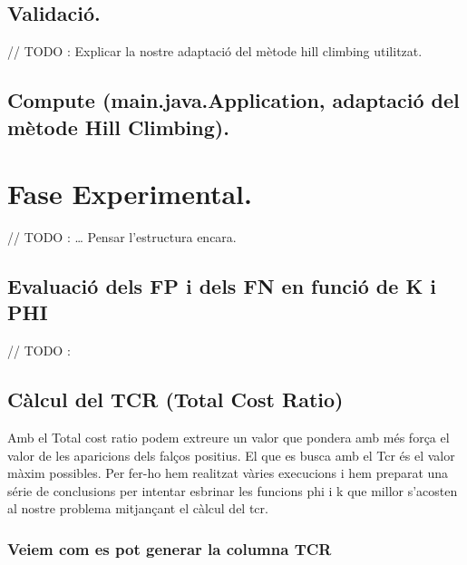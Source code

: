 \documentclass[]{article}
\begin{document}
\hypertarget{validacio.}{%
\subsection{Validació.}\label{validacio.}}

// TODO : Explicar la nostre adaptació del mètode hill climbing
utilitzat.

\hypertarget{compute-application-adaptacio-del-metode-hill-climbing.}{%
\subsection{Compute (main.java.Application, adaptació del mètode Hill
Climbing).}\label{compute-application-adaptacio-del-metode-hill-climbing.}}

\hypertarget{fase-experimental.}{%
\section{Fase Experimental.}\label{fase-experimental.}}

// TODO : \ldots{} Pensar l'estructura encara.

\hypertarget{evaluacio-dels-fp-i-dels-fn-en-funcio-de-k-i-phi}{%
\subsection{Evaluació dels FP i dels FN en funció de K i
PHI}\label{evaluacio-dels-fp-i-dels-fn-en-funcio-de-k-i-phi}}

// TODO :

\hypertarget{calcul-del-tcr-total-cost-ratio}{%
\subsection{Càlcul del TCR (Total Cost
Ratio)}\label{calcul-del-tcr-total-cost-ratio}}

Amb el Total cost ratio podem extreure un valor que pondera amb més
força el valor de les aparicions dels falços positius. El que es busca
amb el Tcr és el valor màxim possibles. Per fer-ho hem realitzat vàries
execucions i hem preparat una série de conclusions per intentar esbrinar
les funcions phi i k que millor s'acosten al nostre problema mitjançant
el càlcul del tcr.

\hypertarget{veiem-com-es-pot-generar-la-columna-tcr}{%
\subsubsection{Veiem com es pot generar la columna
TCR}\label{veiem-com-es-pot-generar-la-columna-tcr}}
\end{document}
